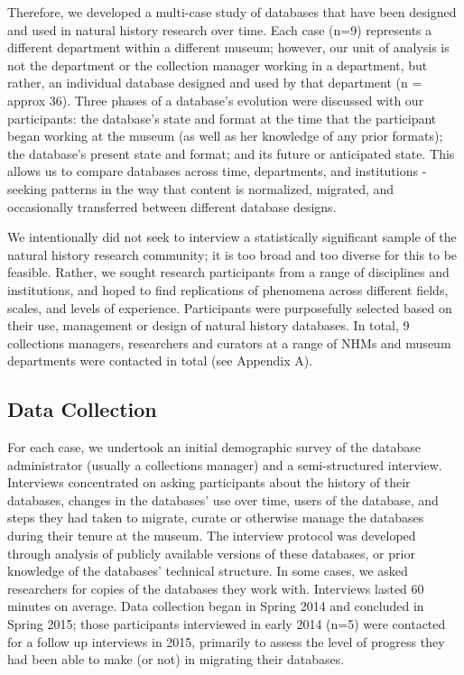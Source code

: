 Therefore, we developed a multi-case study of databases that have been designed and used in natural history research over time. Each case (n=9) represents a different department within a different museum; however, our unit of analysis is not the department or the collection manager working in a department, but rather, an individual database designed and used by that department (n = approx 36). Three phases of a database's evolution were discussed with our participants: the database's state and format at the time that the participant began working at the museum (as well as her knowledge of any prior formats); the database's present state and format; and its future or anticipated state. This allows us to compare databases across time, departments, and institutions - seeking patterns in the way that content is normalized, migrated, and occasionally transferred between different database designs. 

We intentionally did not seek to interview a statistically significant sample of the natural history research community; it is too broad and too diverse for this to be feasible. Rather, we sought research participants from a range of disciplines and institutions, and hoped to find replications of phenomena across different fields, scales, and levels of experience. Participants were purposefully selected based on their use, management or design of natural history databases. In total, 9 collections managers, researchers and curators at a range of NHMs and museum departments were contacted in total (see Appendix A).

\subsection{Data Collection}
For each case, we undertook an initial demographic survey of the database administrator (usually a collections manager) and a semi-structured interview. Interviews concentrated on asking participants about the history of their databases, changes in the databases’ use over time, users of the database, and steps they had taken to migrate, curate or otherwise manage the databases during their tenure at the museum. The interview protocol was developed through analysis of publicly available versions of these databases, or prior knowledge of the databases’ technical structure. In some cases, we asked researchers for copies of the databases they work with. Interviews lasted 60 minutes on average. Data collection began in Spring 2014 and concluded in Spring 2015; those participants interviewed in early 2014 (n=5) were contacted for a follow up interviews in 2015, primarily to assess the level of progress they had been able to make (or not) in migrating their databases.


